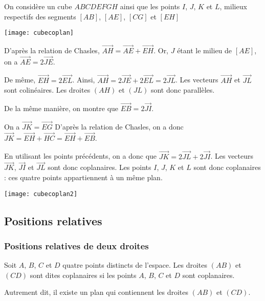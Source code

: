 \documentclass[11pt,fleqn, openany]{book} %
\begin{document}
\begin{example}On considère un cube $ABCDEFGH$ ainsi que les points $I$, $J$, $K$ et $L$, milieux respectifs des segments $[AB]$, $[AE]$, $[CG]$ et $[EH]$

\begin{center}
\texttt{[image: cubecoplan]}
\end{center}

D'après la relation de Chasles, $\overrightarrow{AH}=\overrightarrow{AE}+\overrightarrow{EH}$. Or, $J$ étant le milieu de $[AE]$, on a $\overrightarrow{AE}=2\overrightarrow{JE}$. 

De même, $\overrightarrow{EH}=2\overrightarrow{EL}$. Ainsi, $\overrightarrow{AH}=2\overrightarrow{JE}+2\overrightarrow{EL}=2\overrightarrow{JL}$. Les vecteurs $\overrightarrow{AH}$ et $\overrightarrow{JL}$ sont colinéaires.
Les droites $(AH)$ et $(JL)$ sont donc parallèles.

De la même manière, on montre que $\overrightarrow{EB}=2\overrightarrow{JI}$.

On a $\overrightarrow{JK}=\overrightarrow{EG}$ D'après la relation de Chasles, on a donc $\overrightarrow{JK}=\overrightarrow{EH}+\overrightarrow{HC}=\overrightarrow{EH}+\overrightarrow{EB}$. 

En utilisant les points précédents, on a donc que $\overrightarrow{JK}=2\overrightarrow{JL}+2\overrightarrow{JI}$. Les vecteurs $\overrightarrow{JK}$, $\overrightarrow{JI}$ et $\overrightarrow{JL}$ sont donc coplanaires. Les points $I$, $J$, $K$ et $L$ sont donc coplanaires : ces quatre points appartiennent à un même plan.


\begin{center}
\texttt{[image: cubecoplan2]}
\end{center}

\end{example}
\newpage
\subsection{Positions relatives}

\subsubsection{Positions relatives de deux droites}

\begin{definition} Soit $A$, $B$, $C$ et $D$ quatre points distincts de l'espace. Les droites $(AB)$ et $(CD)$ sont dites coplanaires si les points $A$, $B$, $C$ et $D$ sont coplanaires.

Autrement dit, il existe un plan qui contiennent les droites $(AB)$ et $(CD)$.\end{definition}
\end{document}
